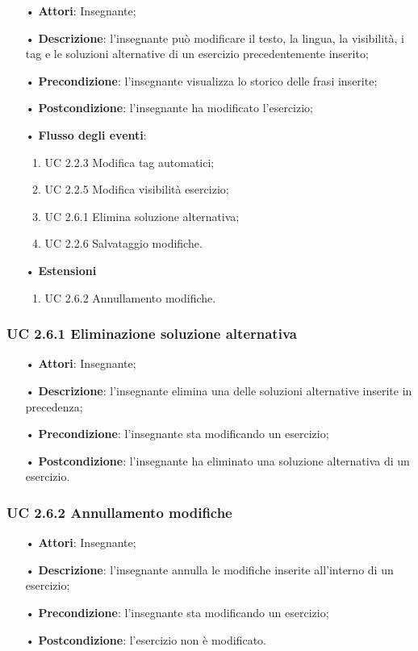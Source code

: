 \begin{itemize}
	\item[•] \textbf{Attori}: Insegnante;
	\item[•] \textbf{Descrizione}: l’insegnante può modificare il testo, la lingua, la visibilità, i tag e le soluzioni alternative di un esercizio precedentemente inserito;
	\item[•] \textbf{Precondizione}: l'insegnante visualizza lo storico delle frasi inserite;
	\item[•] \textbf{Postcondizione}: l’insegnante ha modificato l'esercizio;
	\item[•] \textbf{Flusso degli eventi}:
		\begin{enumerate}
			\item UC 2.2.3 Modifica tag automatici;
			\item UC 2.2.5 Modifica visibilità esercizio;
			\item UC 2.6.1 Elimina soluzione alternativa;
			\item UC 2.2.6 Salvataggio modifiche.
		\end{enumerate}
	\item[•] \textbf{Estensioni}
	\begin{enumerate}
		\item UC 2.6.2 Annullamento modifiche.
	\end{enumerate}
\end{itemize}   

\subsubsection{UC 2.6.1 Eliminazione soluzione alternativa}
\begin{itemize}
	\item[•] \textbf{Attori}: Insegnante;
	\item[•] \textbf{Descrizione}: l'insegnante elimina una delle soluzioni alternative inserite in precedenza;
	\item[•] \textbf{Precondizione}: l'insegnante sta modificando un esercizio;
	\item[•] \textbf{Postcondizione}: l'insegnante ha eliminato una soluzione alternativa di un esercizio.
\end{itemize}

\subsubsection{UC 2.6.2 Annullamento modifiche}
\begin{itemize}
	\item[•] \textbf{Attori}: Insegnante;
	\item[•] \textbf{Descrizione}: l'insegnante annulla le modifiche inserite all'interno di un esercizio; 
	\item[•] \textbf{Precondizione}: l'insegnante sta modificando un esercizio;
	\item[•] \textbf{Postcondizione}: l'esercizio non è modificato.
\end{itemize}


